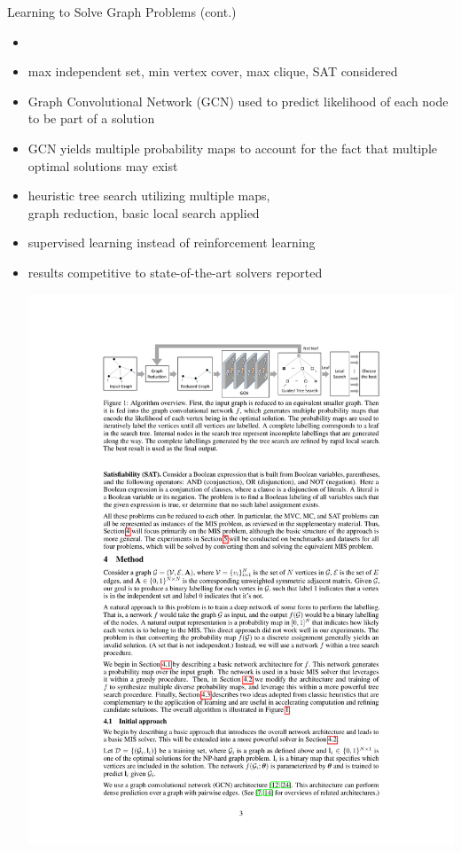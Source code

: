 \documentclass[aspectratio=1610]{beamer}
\newcommand{\important}[1]{{\color{green!60!black}#1}}
\begin{document}
\begin{frame}{Learning to Solve Graph Problems (cont.)}
\begin{itemize}
	\itemsep1ex
	\item {}
	\item max independent set, min vertex cover, max clique, SAT considered
	\item \important{Graph Convolutional Network (GCN)} used to predict likelihood of each node to be part of a solution
	\item GCN yields \important{multiple probability maps} to account for the fact that multiple optimal solutions may exist
	\item \important{heuristic tree search} utilizing multiple maps,\\ \important{graph reduction, basic local search} applied
	\item \important{supervised learning} instead of reinforcement learning
	\item results competitive to state-of-the-art solvers reported 
	\medskip
	\begin{center}
		\includegraphics[width=1\linewidth]{figures/li}
	\end{center}
\end{itemize}
\end{frame}
\end{document}
